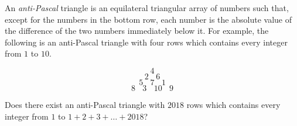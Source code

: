 An \emph{anti-Pascal} triangle is an equilateral triangular array of numbers such that, except for the numbers in the bottom row, each number is the absolute value of the difference of the two numbers immediately below it. For example, the following is an anti-Pascal triangle with four rows which contains every integer from $1$ to $10$.
 
$$4$$%
$$2\ \ \ \ 6$$%
$$5\ \ \ \ 7\ \ \ \ 1$$%
$$8\ \ \ \ 3\ \ \ \ 10\ \ \ \ 9$$%

Does there exist an anti-Pascal triangle with $2018$ rows which contains every integer from $1$ to $1 + 2 + 3 + \dots + 2018$?

